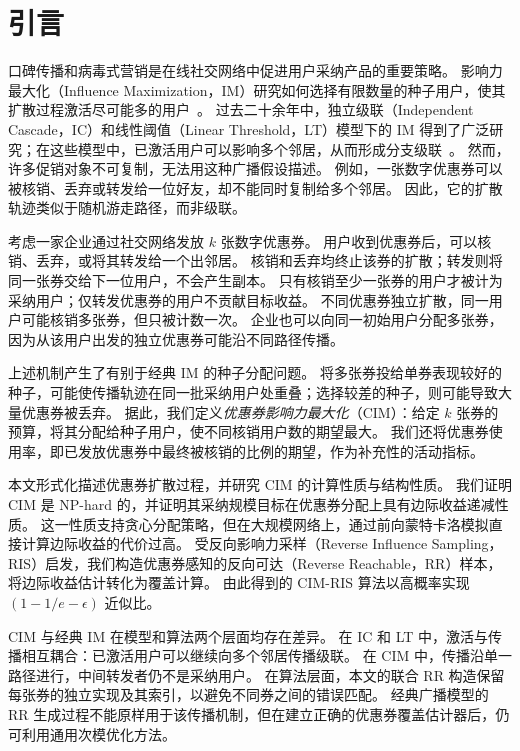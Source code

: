 \documentclass[sigconf,balance=false]{acmart}
\newcommand{\CIMRIS}{\textsc{CIM-RIS}}
\begin{document}

\section{引言}
\label{sec:intro}

口碑传播和病毒式营销是在线社交网络中促进用户采纳产品的重要策略。
影响力最大化（Influence Maximization，IM）研究如何选择有限数量的种子用户，使其扩散过程激活尽可能多的用户~\cite{kempe2003maximizing}。
过去二十余年中，独立级联（Independent Cascade，IC）和线性阈值（Linear Threshold，LT）模型下的 IM 得到了广泛研究；在这些模型中，已激活用户可以影响多个邻居，从而形成分支级联~\cite{domingos2001mining,borgs2014maximizing,tang2015influence}。
然而，许多促销对象不可复制，无法用这种广播假设描述。
例如，一张数字优惠券可以被核销、丢弃或转发给一位好友，却不能同时复制给多个邻居。
因此，它的扩散轨迹类似于随机游走路径，而非级联。

考虑一家企业通过社交网络发放 $k$ 张数字优惠券。
用户收到优惠券后，可以核销、丢弃，或将其转发给一个出邻居。
核销和丢弃均终止该券的扩散；转发则将同一张券交给下一位用户，不会产生副本。
只有核销至少一张券的用户才被计为采纳用户；仅转发优惠券的用户不贡献目标收益。
不同优惠券独立扩散，同一用户可能核销多张券，但只被计数一次。
企业也可以向同一初始用户分配多张券，因为从该用户出发的独立优惠券可能沿不同路径传播。

上述机制产生了有别于经典 IM 的种子分配问题。
将多张券投给单券表现较好的种子，可能使传播轨迹在同一批采纳用户处重叠；选择较差的种子，则可能导致大量优惠券被丢弃。
据此，我们定义\emph{优惠券影响力最大化}（CIM）：给定 $k$ 张券的预算，将其分配给种子用户，使不同核销用户数的期望最大。
我们还将优惠券使用率，即已发放优惠券中最终被核销的比例的期望，作为补充性的活动指标。

本文形式化描述优惠券扩散过程，并研究 CIM 的计算性质与结构性质。
我们证明 CIM 是 NP-hard 的，并证明其采纳规模目标在优惠券分配上具有边际收益递减性质。
这一性质支持贪心分配策略，但在大规模网络上，通过前向蒙特卡洛模拟直接计算边际收益的代价过高。
受反向影响力采样（Reverse Influence Sampling，RIS）启发，我们构造优惠券感知的反向可达（Reverse Reachable，RR）样本，将边际收益估计转化为覆盖计算。
由此得到的 \CIMRIS{} 算法以高概率实现 $(1-1/e-\epsilon)$ 近似比。

CIM 与经典 IM 在模型和算法两个层面均存在差异。
在 IC 和 LT 中，激活与传播相互耦合：已激活用户可以继续向多个邻居传播级联。
在 CIM 中，传播沿单一路径进行，中间转发者仍不是采纳用户。
在算法层面，本文的联合 RR 构造保留每张券的独立实现及其索引，以避免不同券之间的错误匹配。
经典广播模型的 RR 生成过程不能原样用于该传播机制，但在建立正确的优惠券覆盖估计器后，仍可利用通用次模优化方法。
\end{document}
